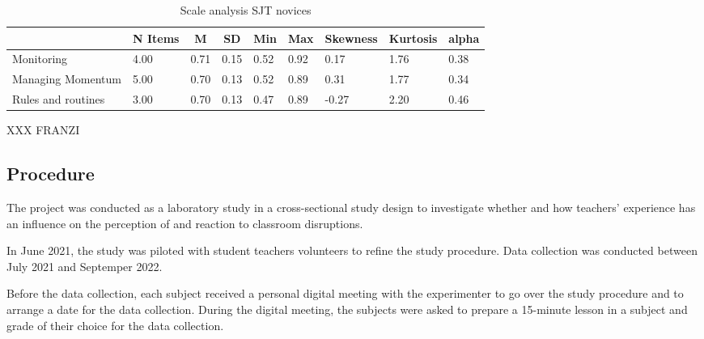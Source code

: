 \documentclass[
  man]{apa6}
\begin{document}
\begin{table}[h]

\begin{center}
\begin{threeparttable}

\caption{\label{tab:sjt}Scale analysis SJT novices}

\tiny{

\begin{tabular}{lllllllll}
\toprule
 & \multicolumn{1}{c}{N Items} & \multicolumn{1}{c}{M} & \multicolumn{1}{c}{SD} & \multicolumn{1}{c}{Min} & \multicolumn{1}{c}{Max} & \multicolumn{1}{c}{Skewness} & \multicolumn{1}{c}{Kurtosis} & \multicolumn{1}{c}{alpha}\\
\midrule
Monitoring & 4.00 & 0.71 & 0.15 & 0.52 & 0.92 & 0.17 & 1.76 & 0.38\\
Managing Momentum & 5.00 & 0.70 & 0.13 & 0.52 & 0.89 & 0.31 & 1.77 & 0.34\\
Rules and routines & 3.00 & 0.70 & 0.13 & 0.47 & 0.89 & -0.27 & 2.20 & 0.46\\
\bottomrule
\end{tabular}

}

\end{threeparttable}
\end{center}

\end{table}

XXX FRANZI

\hypertarget{procedure}{%
\subsection{Procedure}\label{procedure}}

The project was conducted as a laboratory study in a cross-sectional study design to investigate whether and how teachers' experience has an influence on the perception of and reaction to classroom disruptions.

In June 2021, the study was piloted with student teachers volunteers to refine the study procedure. Data collection was conducted between July 2021 and Septemper 2022.

Before the data collection, each subject received a personal digital meeting with the experimenter to go over the study procedure and to arrange a date for the data collection. During the digital meeting, the subjects were asked to prepare a 15-minute lesson in a subject and grade of their choice for the data collection.
\end{document}
